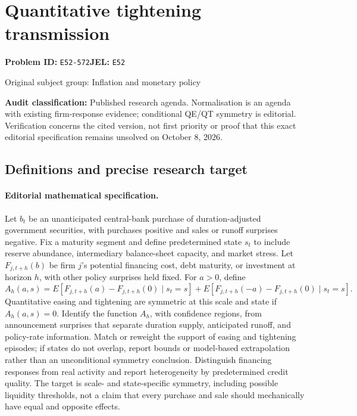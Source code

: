 \documentclass[11pt,a4paper]{article}
\begin{document}
\section*{Quantitative tightening transmission}
\textbf{Problem ID:} \texttt{E52-572}\quad \textbf{JEL:} \texttt{E52}\par
\label{problem:OP-0246}
{\sffamily\small\color{muted}Original subject group: Inflation and monetary policy\par}
\label{definitions:problem:30007527}
\textbf{Audit classification:} Published research agenda. Normalisation is an agenda with existing firm-response evidence; conditional QE/QT symmetry is editorial. Verification concerns the cited version, not first priority or proof that this exact editorial specification remains unsolved on October 8, 2026.
\subsection*{Definitions and precise research target}
\paragraph{Editorial mathematical specification.} Let \(b_t\) be an unanticipated central-bank purchase of duration-adjusted government securities, with purchases positive and sales or runoff surprises negative. Fix a maturity segment and define predetermined state \(s_t\) to include reserve abundance, intermediary balance-sheet capacity, and market stress. Let \(F_{j,t+h}(b)\) be firm \(j\)'s potential financing cost, debt maturity, or investment at horizon \(h\), with other policy surprises held fixed. For \(a>0\), define
\[
A_h(a,s)=E[F_{j,t+h}(a)-F_{j,t+h}(0)\mid s_t=s]
+E[F_{j,t+h}(-a)-F_{j,t+h}(0)\mid s_t=s].
\]
Quantitative easing and tightening are symmetric at this scale and state if \(A_h(a,s)=0\). Identify the function \(A_h\), with confidence regions, from announcement surprises that separate duration supply, anticipated runoff, and policy-rate information. Match or reweight the support of easing and tightening episodes; if states do not overlap, report bounds or model-based extrapolation rather than an unconditional symmetry conclusion. Distinguish financing responses from real activity and report heterogeneity by predetermined credit quality. The target is scale- and state-specific symmetry, including possible liquidity thresholds, not a claim that every purchase and sale should mechanically have equal and opposite effects.
\end{document}
